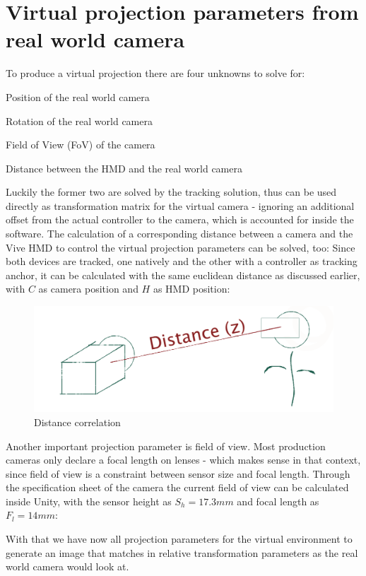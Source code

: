 %
\section{Virtual projection parameters from real world camera}
\label{sec:projection-params}
To produce a virtual projection there are four unknowns to solve for:

\begin{my_list}
	\item Position of the real world camera
	\item Rotation of the real world camera
	\item Field of View (FoV) of the camera
	\item Distance between the HMD and the real world camera
\end{my_list}

Luckily the former two are solved by the tracking solution, thus can be used 
directly as transformation matrix for the virtual camera - ignoring an 
additional offset from the actual controller to the camera, which is accounted 
for inside the software.
\newline
The calculation of a corresponding distance between a camera and the Vive HMD 
to control the virtual projection parameters can be solved, too: Since both 
devices are tracked, one natively and the other with a controller as 
tracking anchor, it can be calculated with the same euclidean distance as 
discussed earlier, with $C$ as camera position and $H$ as HMD position:


\begin{figure}[htb]
	\includegraphics[width=\textwidth]{_raw_resources/composition/Composition-Z-Distance.png}
	\caption{Distance correlation}
	\label{fig:projection:distance}
\end{figure}

Another important projection parameter is field of view. Most production 
cameras only declare a focal length on lenses - which makes sense in that 
context, since field of view is a constraint between sensor size and focal 
length. Through the specification sheet of the camera the current field of view 
can be calculated inside Unity, with the sensor height as $S_h = 17.3mm$ and 
focal length as $F_l = 14mm$:



With that we have now all projection parameters for the virtual environment to 
generate an image that matches in relative transformation parameters as the 
real world camera would look at.